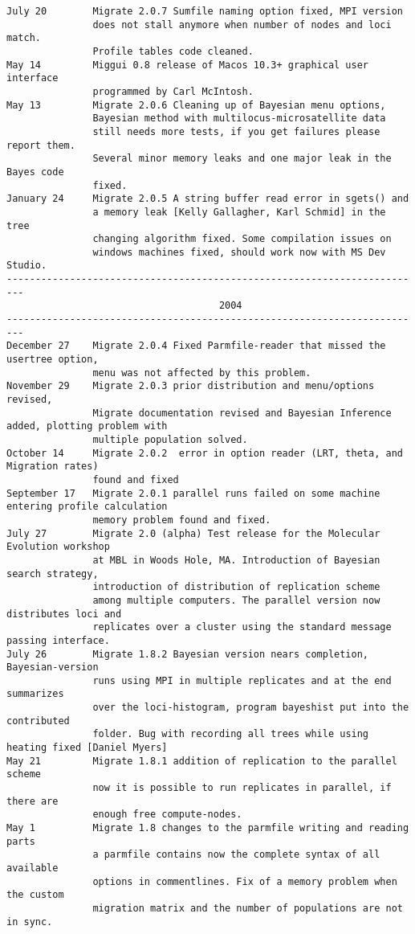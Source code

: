 \begin{small}
\begin{verbatim}
July 20        Migrate 2.0.7 Sumfile naming option fixed, MPI version 
               does not stall anymore when number of nodes and loci match.
               Profile tables code cleaned.
May 14         Miggui 0.8 release of Macos 10.3+ graphical user interface
               programmed by Carl McIntosh.
May 13         Migrate 2.0.6 Cleaning up of Bayesian menu options, 
               Bayesian method with multilocus-microsatellite data
               still needs more tests, if you get failures please report them.
               Several minor memory leaks and one major leak in the Bayes code
               fixed.  
January 24     Migrate 2.0.5 A string buffer read error in sgets() and 
               a memory leak [Kelly Gallagher, Karl Schmid] in the tree 
               changing algorithm fixed. Some compilation issues on 
               windows machines fixed, should work now with MS Dev Studio. 
-------------------------------------------------------------------------
                                     2004
-------------------------------------------------------------------------
December 27    Migrate 2.0.4 Fixed Parmfile-reader that missed the usertree option, 
               menu was not affected by this problem.
November 29    Migrate 2.0.3 prior distribution and menu/options revised,
               Migrate documentation revised and Bayesian Inference added, plotting problem with
               multiple population solved.
October 14     Migrate 2.0.2  error in option reader (LRT, theta, and Migration rates) 
               found and fixed
September 17   Migrate 2.0.1 parallel runs failed on some machine entering profile calculation
               memory problem found and fixed.
July 27        Migrate 2.0 (alpha) Test release for the Molecular Evolution workshop
               at MBL in Woods Hole, MA. Introduction of Bayesian search strategy, 
               introduction of distribution of replication scheme 
               among multiple computers. The parallel version now distributes loci and 
               replicates over a cluster using the standard message passing interface.             
July 26        Migrate 1.8.2 Bayesian version nears completion, Bayesian-version
               runs using MPI in multiple replicates and at the end summarizes 
               over the loci-histogram, program bayeshist put into the contributed 
               folder. Bug with recording all trees while using heating fixed [Daniel Myers]
May 21         Migrate 1.8.1 addition of replication to the parallel scheme
               now it is possible to run replicates in parallel, if there are
               enough free compute-nodes.
May 1          Migrate 1.8 changes to the parmfile writing and reading parts
               a parmfile contains now the complete syntax of all available
               options in commentlines. Fix of a memory problem when the custom
               migration matrix and the number of populations are not in sync.


\end{verbatim}
\end{small}
